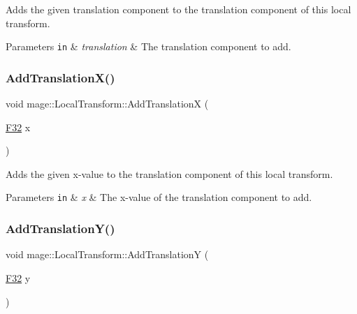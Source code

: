 Adds the given translation component to the translation component of this local transform.


\begin{DoxyParams}[1]{Parameters}
\mbox{\tt in}  & {\em translation} & The translation component to add. \\
\hline
\end{DoxyParams}
\hypertarget{classmage_1_1_local_transform_aa1e2f6f7db150734e6f10a9d695202d7}{}\label{classmage_1_1_local_transform_aa1e2f6f7db150734e6f10a9d695202d7} 
\subsubsection{\texorpdfstring{Add\+Translation\+X()}{AddTranslationX()}}
{\footnotesize\ttfamily void mage\+::\+Local\+Transform\+::\+Add\+TranslationX (\begin{DoxyParamCaption}\item[{\hyperlink{namespacemage_aa97e833b45f06d60a0a9c4fc22ae02c0}{F32}}]{x }\end{DoxyParamCaption})\hspace{0.3cm}{\ttfamily [noexcept]}}

Adds the given x-\/value to the translation component of this local transform.


\begin{DoxyParams}[1]{Parameters}
\mbox{\tt in}  & {\em x} & The x-\/value of the translation component to add. \\
\hline
\end{DoxyParams}
\hypertarget{classmage_1_1_local_transform_a3e058e92d72b6709957712a7d808a6e5}{}\label{classmage_1_1_local_transform_a3e058e92d72b6709957712a7d808a6e5} 
\subsubsection{\texorpdfstring{Add\+Translation\+Y()}{AddTranslationY()}}
{\footnotesize\ttfamily void mage\+::\+Local\+Transform\+::\+Add\+TranslationY (\begin{DoxyParamCaption}\item[{\hyperlink{namespacemage_aa97e833b45f06d60a0a9c4fc22ae02c0}{F32}}]{y }\end{DoxyParamCaption})\hspace{0.3cm}{\ttfamily [noexcept]}}


